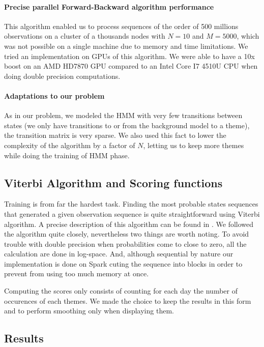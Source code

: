 \paragraph{Precise parallel Forward-Backward algorithm performance}
This algorithm enabled us to process sequences of the order of 500 millions observations on a cluster of a thousands nodes with $N=10$ and $M=5000$, which was not possible on a single machine due to memory and time limitations.
We tried an implementation on GPUs of this algorithm. We were able to have a 10x boost on an AMD HD7870 GPU compared to an Intel Core I7 4510U CPU when doing double precision computations.

\paragraph{Adaptations to our problem}
As in our problem, we modeled the HMM with very few transitions between states (we only have transitions to or from the background model to a theme), the transition matrix is very sparse. We also used this fact to lower the complexity of the algorithm by a factor of $N$, letting us to keep more themes while doing the training of HMM phase.

\subsection{Viterbi Algorithm and Scoring functions}
Training is from far the hardest task. Finding the most probable states sequences that generated a given observation sequence is quite straightforward using Viterbi algorithm. A precise description of this algorithm can be found in \cite{rabiner1989tutorial}.
We followed the algorithm quite closely, nevertheless two things are worth noting. To avoid trouble with double precision when probabilities come to close to zero, all the calculation are done in log-space. And, although sequential by nature our implementation is done on Spark cuting the sequence into blocks in order to prevent from using too much memory at once.

Computing the scores only consists of counting for each day the number of occurences of each themes. We made the choice to keep the results in this form and to perform smoothing only when displaying them.

\subsection{Results}





